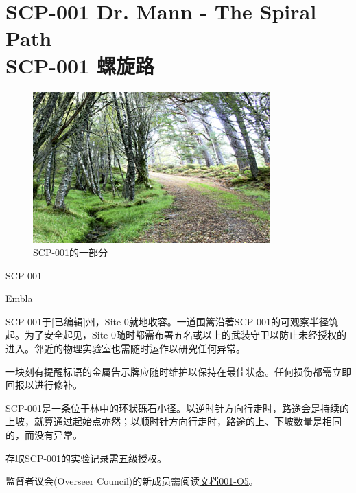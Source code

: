 \chapter[SCP-001 螺旋路]{
	SCP-001 Dr. Mann - The Spiral Path \\
	SCP-001 螺旋路
}

\label{chap:SCP-001.the.spiral.path}

\begin{figure}[H]
	\centering
	\includegraphics[width=0.5\linewidth]{images/SCP.001.6.jpg}
	\caption*{SCP-001的一部分}
\end{figure}

SCP-001

Embla

SCP-001于[已编辑]州，Site 0就地收容。一道围篱沿著SCP-001的可观察半径筑起。为了安全起见，Site 0随时都需布署五名或以上的武装守卫以防止未经授权的进入。邻近的物理实验室也需随时运作以研究任何异常。

一块刻有提醒标语的金属告示牌应随时维护以保持在最佳状态。任何损伤都需立即回报以进行修补。

SCP-001是一条位于林中的环状砾石小径。以逆时针方向行走时，路途会是持续的上坡，就算通过起始点亦然；以顺时针方向行走时，路途的上、下坡数量是相同的，而没有异常。

存取SCP-001的实验记录需五级授权。

监督者议会(Overseer Council)的新成员需阅读\hyperref[chap:doc.001-05]{文档001-O5}。